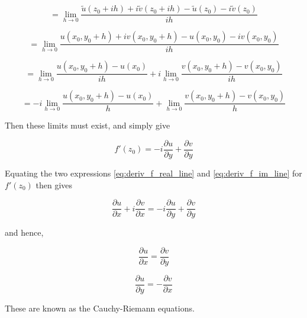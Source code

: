 \documentclass{article}
\begin{document}
\begin{equation}
= \lim_{h \to 0}\frac{\tilde{u}(z_0 + ih) + i\tilde{v}(z_0 + ih) - \tilde{u}(z_0) - i\tilde{v}(z_0)}{ih}
\end{equation}


\begin{equation}
= \lim_{h \to 0}\frac{u(x_0, y_0 + h) + iv(x_0, y_0 + h) - u(x_0, y_0) - iv(x_0, y_0)}{ih}
\end{equation}


\begin{equation}
= \lim_{h \to 0}\frac{u(x_0, y_0+h) - u(x_0)}{ih} + i\lim_{h \to 0}\frac{v(x_0, y_0+h)-v(x_0, y_0)}{ih}
\end{equation}


\begin{equation}
= -i\lim_{h \to 0}\frac{u(x_0, y_0+h) - u(x_0)}{h} + \lim_{h \to 0}\frac{v(x_0, y_0+h)-v(x_0, y_0)}{h}
\end{equation}


Then these limits must exist, and simply give

\begin{equation}
\label{eq:deriv_f_im_line}
f'(z_0) = -i\frac{\partial u}{\partial y} + \frac{\partial v}{\partial y}
\end{equation}

Equating the two expressions \eqref{eq:deriv_f_real_line} and \eqref{eq:deriv_f_im_line} for $f'(z_0)$ then gives

\begin{equation}
\frac{\partial u}{\partial x} + i\frac{\partial v}{\partial x} = -i\frac{\partial u}{\partial y} + \frac{\partial v}{\partial y}
\end{equation}

and hence,

\begin{equation}
\frac{\partial u}{\partial x} = \frac{\partial v}{\partial y}
\end{equation}

\begin{equation}
\frac{\partial u}{\partial y} = -\frac{\partial v}{\partial x}
\end{equation}

These are known as the Cauchy-Riemann equations. %


\end{document}
